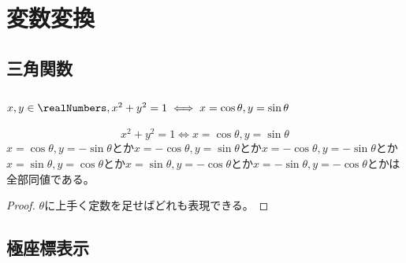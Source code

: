 \chapter{変数変換}
    \section{三角関数}
        \subsection{\texorpdfstring{$x,y\in\realNumbers,x^2+y^2=1\iff x=\cos{\theta},y=\sin{\theta}$}{2乗和が1である2実数x,yは適当なΘ∈Rを用いてx=cos(Θ), y=sin(Θ)と表せる}}
            \begin{shadebox}
                \[x^2+y^2=1\iff x=\cos{\theta},y=\sin{\theta}\]
                $x=\cos{\theta},y=-\sin{\theta}$とか$x=-\cos{\theta},y=\sin{\theta}$とか$x=-\cos{\theta},y=-\sin{\theta}$とか\\
                $x=\sin{\theta},y=\cos{\theta}$とか$x=\sin{\theta},y=-\cos{\theta}$とか$x=-\sin{\theta},y=-\cos{\theta}$とかは全部同値である。
            \end{shadebox}
            \begin{proof}
                \quad\par
                $\theta$に上手く定数を足せばどれも表現できる。
            \end{proof}
    \section{極座標表示}
